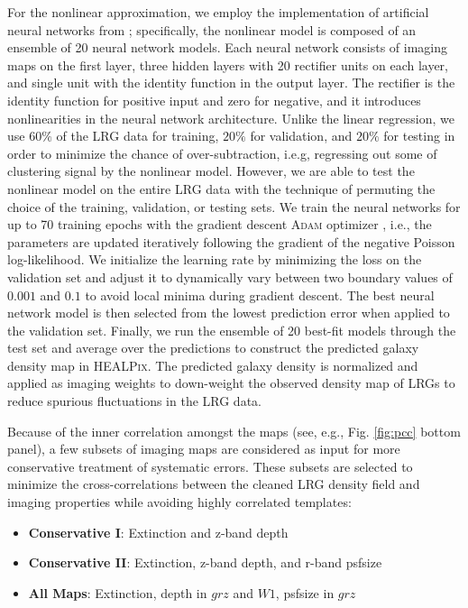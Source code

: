 For the nonlinear approximation, we employ the implementation of artificial neural networks from \cite{rezaie2021primordial}; specifically, the nonlinear model is composed of an ensemble of 20 neural network models. Each neural network consists of imaging maps on the first layer, three hidden layers with 20 rectifier units on each layer, and single unit with the identity function in the output layer. The rectifier is the identity function for positive input and zero for negative, and it introduces nonlinearities in the neural network architecture. Unlike the linear regression, we use $60\%$ of the LRG data for training, $20\%$ for validation, and $20\%$ for testing in order to minimize the chance of over-subtraction, i.e.g, regressing out some of clustering signal by the nonlinear model. However, we are able to test the nonlinear model on the entire LRG data with the technique of permuting the choice of the training, validation, or testing sets. We train the neural networks for up to 70 training epochs with the gradient descent \textsc{Adam} optimizer \citep{2017arXiv171105101L}, i.e., the parameters are updated iteratively following the gradient of the negative Poisson log-likelihood. We initialize the learning rate by minimizing the loss on the validation set and adjust it to dynamically vary between two boundary values of $0.001$ and $0.1$ to avoid local minima during gradient descent. The best neural network model is then selected from the lowest prediction error when applied to the validation set. Finally, we run the ensemble of 20 best-fit models through the test set and average over the predictions to construct the predicted galaxy density map in \textsc{HEALPix}. The predicted galaxy density is normalized and applied as imaging weights to down-weight the observed density map of LRGs to reduce spurious fluctuations in the LRG data. 

Because of the inner correlation amongst the maps (see, e.g., Fig. \ref{fig:pcc} bottom panel), a few subsets of imaging maps are considered as input for more conservative treatment of systematic errors. These subsets are selected to minimize the cross-correlations between the cleaned LRG density field and imaging properties while avoiding highly correlated templates:
\begin{itemize}
\item \textbf{Conservative I}: Extinction and z-band depth
\item \textbf{Conservative II}: Extinction, z-band depth, and r-band psfsize
\item \textbf{All Maps}: Extinction, depth in $grz$ and $W1$, psfsize in $grz$
\end{itemize}

